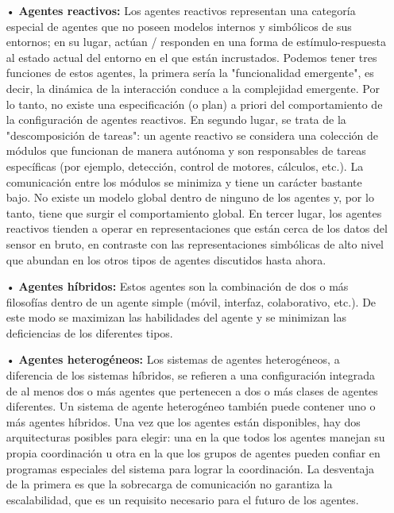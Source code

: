 \begin{itemize}
\item[•] {\bf Agentes reactivos:} \vskip 0.1cm
Los agentes reactivos representan una categoría especial de agentes que no poseen modelos internos y simbólicos de sus entornos; en su lugar, actúan / responden en una forma de estímulo-respuesta al estado actual del entorno en el que están incrustados. 
\vskip 0.1cm
Podemos tener tres funciones de estos agentes, la primera sería  la "funcionalidad emergente", es decir, la dinámica de la interacción conduce a la complejidad emergente. Por lo tanto, no existe una especificación (o plan) a priori del comportamiento de la configuración de agentes reactivos. En segundo lugar, se trata de la "descomposición de tareas": un agente reactivo se considera una colección de módulos que funcionan de manera autónoma y son responsables de tareas específicas (por ejemplo, detección, control de motores, cálculos, etc.). La comunicación entre los módulos se minimiza y tiene un carácter bastante bajo. No existe un modelo global dentro de ninguno de los agentes y, por lo tanto, tiene que surgir el comportamiento global. En tercer lugar, los agentes reactivos tienden a operar en representaciones que están cerca de los datos del sensor en bruto, en contraste con las representaciones simbólicas de alto nivel que abundan en los otros tipos de agentes discutidos hasta ahora.

\item[•] {\bf Agentes híbridos:} \vskip 0.1cm
Estos agentes son la combinación de dos o más filosofías dentro de un agente simple (móvil, interfaz, colaborativo, etc.). De este modo se maximizan las habilidades del agente y se minimizan las deficiencias de los diferentes tipos.

\item[•] {\bf Agentes heterogéneos:} \vskip 0.1cm
Los sistemas de agentes heterogéneos, a diferencia de los sistemas híbridos, se refieren a una configuración integrada de al menos dos o más agentes que pertenecen a dos o más clases de agentes diferentes. Un sistema de agente heterogéneo también puede contener uno o más agentes híbridos.
\vskip 0.1cm
Una vez que los agentes están disponibles, hay dos arquitecturas posibles para elegir: una en la que todos los agentes manejan su propia coordinación u otra en la que los grupos de agentes pueden confiar en programas especiales del sistema para lograr la coordinación. La desventaja de la primera es que la sobrecarga de comunicación no garantiza la escalabilidad, que es un requisito necesario para el futuro de los agentes.

\end{itemize}

